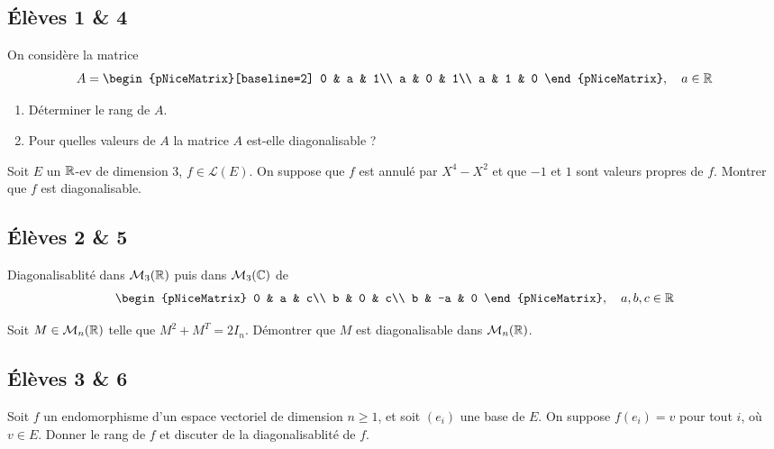 \documentclass[10pt]{scrartcl}
\title{}
\author{}
\date{}
\begin{document}
    \subsection*{Élèves 1 \& 4}
    \begin{ccp}[Numéro 69]
        On considère la matrice 
        \[
            A = \begin{pNiceMatrix}[baseline=2]
                0 & a & 1\\
                a & 0 & 1\\
                a & 1 & 0
            \end{pNiceMatrix},\quad a\in\R
        \]
        \begin{enumerate}
            \item Déterminer le rang de $A$. 
            \item Pour quelles valeurs de $A$ la matrice $A$ est-elle diagonalisable ?
        \end{enumerate}
    \end{ccp}

    \begin{exo}
        Soit $E$ un $\operatorname{\mathbb R}$-ev de dimension $3$, $f\in\mathcal L(E)$. 
        On suppose que $f$ est annulé par $X^4-X^2$ et que $-1$ et $1$ sont valeurs propres de $f$. 
        Montrer que $f$ est diagonalisable.
    \end{exo}

    \subsection*{Élèves 2 \& 5}
    \begin{ccp}[Numéro 67]
        Diagonalisablité dans $\mathcal M_3(\operatorname{\mathbb R})$ puis dans $\mathcal M_3(\operatorname{\mathbb C})$ de 
        \[
            \begin{pNiceMatrix}
                0 & a & c\\
                b & 0 & c\\
                b & -a & 0
            \end{pNiceMatrix},\quad a,b,c\in\R
        \]
    \end{ccp}

    \begin{exo}
        Soit $M\in\mathcal M_n(\operatorname{\mathbb R})$ telle que $M^2+M^T=2I_n$. 
        Démontrer que $M$ est diagonalisable dans $\mathcal M_n(\operatorname{\mathbb R})$.
    \end{exo}

    \subsection*{Élèves 3 \& 6}
    \begin{ccp}[Numéro 72]
        Soit $f$ un endomorphisme d'un espace vectoriel de dimension $n\geq 1$, et soit $(e_i)$ une base de $E$. 
        On suppose $f(e_i)=v$ pour tout $i$, où $v\in E$. 
        Donner le rang de $f$ et discuter de la diagonalisablité de $f$.
    \end{ccp}
\end{document}
